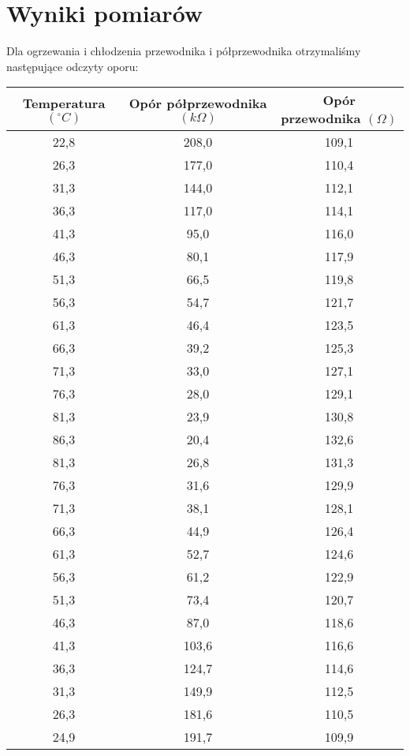\documentclass[10pt,a4paper]{article}
\newcommand{\forceindent}{\leavevmode{\parindent=3em\indent}}
\begin{document}
\section{Wyniki pomiarów}
\forceindent Dla ogrzewania i chłodzenia przewodnika i półprzewodnika otrzymaliśmy następujące odczyty oporu:\\
\begin{center}
\begin{tabular}{|c|c|c|}
\hline
Temperatura $(^{\circ}C)$ & Opór półprzewodnika $(k\Omega)$ & Opór przewodnika $(\Omega)$\\
\hline
22,8&208,0&109,1\\ 
 \hline 
26,3&177,0&110,4\\ 
 \hline 
31,3&144,0&112,1\\ 
 \hline 
36,3&117,0&114,1\\ 
 \hline 
41,3&95,0&116,0\\ 
 \hline 
46,3&80,1&117,9\\ 
 \hline 
51,3&66,5&119,8\\ 
 \hline 
56,3&54,7&121,7\\ 
 \hline 
61,3&46,4&123,5\\ 
 \hline 
66,3&39,2&125,3\\ 
 \hline 
71,3&33,0&127,1\\ 
 \hline 
76,3&28,0&129,1\\ 
 \hline 
81,3&23,9&130,8\\ 
 \hline 
86,3&20,4&132,6\\ 
 \hline 
81,3&26,8&131,3\\ 
 \hline 
76,3&31,6&129,9\\ 
 \hline 
71,3&38,1&128,1\\ 
 \hline 
66,3&44,9&126,4\\ 
 \hline 
61,3&52,7&124,6\\ 
 \hline 
56,3&61,2&122,9\\ 
 \hline 
51,3&73,4&120,7\\ 
 \hline 
46,3&87,0&118,6\\ 
 \hline 
41,3&103,6&116,6\\ 
 \hline 
36,3&124,7&114,6\\ 
 \hline 
31,3&149,9&112,5\\ 
 \hline 
26,3&181,6&110,5\\ 
 \hline 
24,9&191,7&109,9\\ 
 \hline 



\end{tabular}
\end{center}
\end{document}

